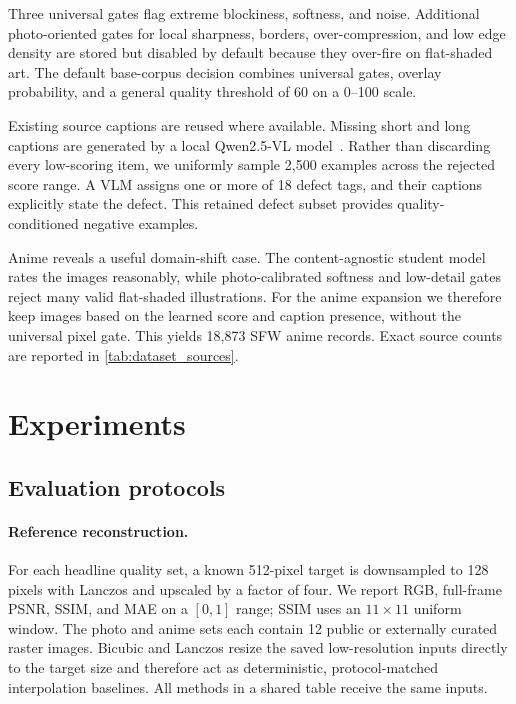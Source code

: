 \documentclass[10pt]{article}
\begin{document}
Three universal gates flag extreme blockiness, softness, and noise. Additional photo-oriented gates for local sharpness, borders, over-compression, and low edge density are stored but disabled by default because they over-fire on flat-shaded art. The default base-corpus decision combines universal gates, overlay probability, and a general quality threshold of 60 on a 0--100 scale.

Existing source captions are reused where available. Missing short and long captions are generated by a local Qwen2.5-VL model~\cite{bai2025qwen25vl}.
Rather than discarding every low-scoring item, we uniformly sample 2,500
examples across the rejected score range. A VLM assigns one or more of 18
defect tags, and their captions explicitly state the defect. This retained
defect subset provides quality-conditioned negative examples.

Anime reveals a useful domain-shift case. The content-agnostic student model
rates the images reasonably, while photo-calibrated softness and low-detail
gates reject many valid flat-shaded illustrations. For the anime expansion we
therefore keep images based on the learned score and caption presence, without
the universal pixel gate. This yields 18,873 SFW anime records. Exact source
counts are reported in \cref{tab:dataset_sources}.

\section{Experiments}
\label{sec:experiments}

\subsection{Evaluation protocols}

\paragraph{Reference reconstruction.}
For each headline quality set, a known 512-pixel target is downsampled to 128
pixels with Lanczos and upscaled by a factor of four. We report RGB,
full-frame PSNR, SSIM, and MAE on a $[0,1]$ range; SSIM uses an $11\times11$
uniform window. The photo and anime sets each contain 12 public or externally
curated raster images. Bicubic and Lanczos resize the saved low-resolution
inputs directly to the target size and therefore act as deterministic,
protocol-matched interpolation baselines. All methods in a shared table
receive the same inputs.
\end{document}
